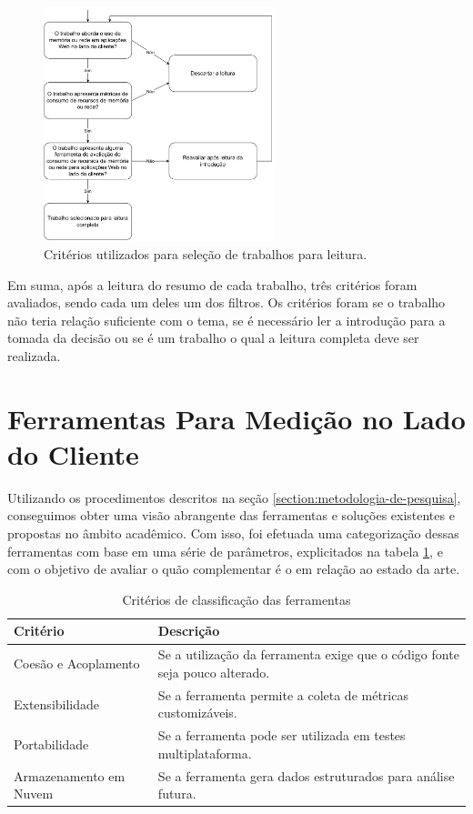 \documentclass[12pt]{tcc}
\begin{document}
	\begin{figure}[H]
		\centering
		\includegraphics[width=0.6\textwidth]{figures/fluxo-decisao-leitura.pdf}
		\caption{Critérios utilizados para seleção de trabalhos para leitura.}
		\label{fig:fluxo-leitura}
	\end{figure}

	Em suma, após a leitura do resumo de cada trabalho, três critérios foram avaliados, sendo cada um deles um dos filtros.	Os critérios foram se o trabalho não teria relação suficiente com o tema, se é necessário ler a introdução para a tomada da decisão ou se é um trabalho o qual a leitura completa deve ser realizada.


	\section{Ferramentas Para Medição no Lado do Cliente}
	\label{sec:avaliacao-ferramentas-encontradas}

	Utilizando os procedimentos descritos na seção \ref{section:metodologia-de-pesquisa}, conseguimos obter uma visão abrangente das ferramentas e soluções existentes e propostas no âmbito acadêmico. Com isso, foi efetuada uma categorização dessas ferramentas com base em uma série de parâmetros, explicitados na tabela \ref{tab:criterio-avaliacao-ferramentas}, e com o objetivo de avaliar o quão complementar é o  em relação ao estado da arte.
	

	\begin{table}[!ht]
		\centering
		\caption{Critérios de classificação das ferramentas}
		\begin{tabular}{lp{8.5cm}}
			\toprule
			\textbf{Critério} & \textbf{Descrição}\\
			\midrule 
			Coesão e Acoplamento & Se a utilização da ferramenta exige que o código fonte seja pouco alterado.\\
			Extensibilidade & Se a ferramenta permite a coleta de métricas customizáveis.\\
			Portabilidade & Se a ferramenta pode ser utilizada em testes multiplataforma.\\
			Armazenamento em Nuvem & Se a ferramenta gera dados estruturados para análise futura.\\
			\bottomrule
		\end{tabular}
		\label{tab:criterio-avaliacao-ferramentas}
	\end{table}
	
\end{document}
